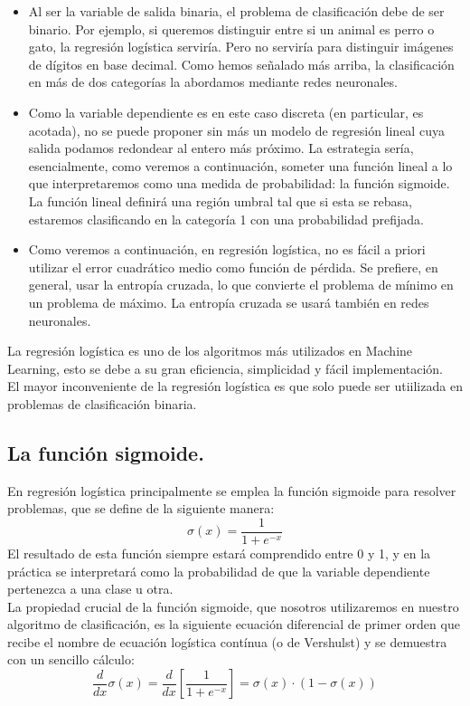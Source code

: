 \documentclass[a4paper,11pt]{article}
\begin{document}
\begin{itemize}
\item Al ser la variable de salida binaria, el problema de clasificación debe de ser binario. Por ejemplo, si queremos distinguir entre si un animal es perro o gato, la regresión logística serviría. Pero no serviría para distinguir imágenes de dígitos en base decimal. Como hemos señalado más arriba, la clasificación en más de dos categorías la abordamos mediante redes neuronales.
\item Como la variable dependiente es en este caso discreta (en particular, es acotada), no se puede proponer sin más un modelo de regresión lineal cuya salida
podamos redondear al entero más próximo. La estrategia sería, esencialmente,
como veremos a continuación, someter una función lineal a lo que interpretaremos como una medida de probabilidad: la función sigmoide. La función lineal
definirá una región umbral tal que si esta se rebasa, estaremos clasificando en la
categoría 1 con una probabilidad prefijada.

\item Como veremos a continuación, en regresión logística, no es fácil a priori utilizar el error cuadrático medio como función de pérdida. Se prefiere, en general,
usar la entropía cruzada, lo que convierte el problema de mínimo en un problema
de máximo. La entropía cruzada se usará también en redes neuronales.

\end{itemize}
La regresión logística es uno de los algoritmos más utilizados en Machine Learning, esto se debe a su gran eficiencia, simplicidad y fácil implementación.\\

\noindent
El mayor inconveniente de la regresión logística es que solo puede ser utiilizada en problemas de clasificación binaria.

\subsection{La función sigmoide.}
En regresión logística principalmente se emplea la función sigmoide para resolver problemas, que se define de la siguiente manera: 
\[
\sigma(x)=\frac{1}{1+e^{-x}}
\]
El resultado de esta función siempre estará comprendido entre 0 y 1, y en la práctica se interpretará como la probabilidad de que la variable dependiente pertenezca a una clase u otra.\\

\noindent
La propiedad crucial de la función sigmoide, que nosotros utilizaremos en nuestro algoritmo de clasificación, es la siguiente ecuación diferencial de primer
orden que recibe el nombre de ecuación logística contínua (o de Vershulst) y se demuestra con un sencillo cálculo:
\[
\frac{d}{dx}\sigma(x)=\frac{d}{dx}\left[\frac{1}{1+e^{-x}}\right]=\sigma(x)\cdot(1-\sigma(x))
\]
\end{document}
